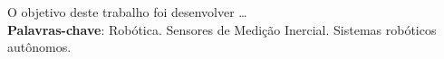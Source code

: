 \begin{resumo}[RESUMO]
\begin{SingleSpacing}


    O objetivo deste trabalho foi desenvolver \ldots\\

    \textbf{Palavras-chave}: Robótica. Sensores de Medição Inercial. Sistemas
    robóticos autônomos.

\end{SingleSpacing}
\end{resumo}

